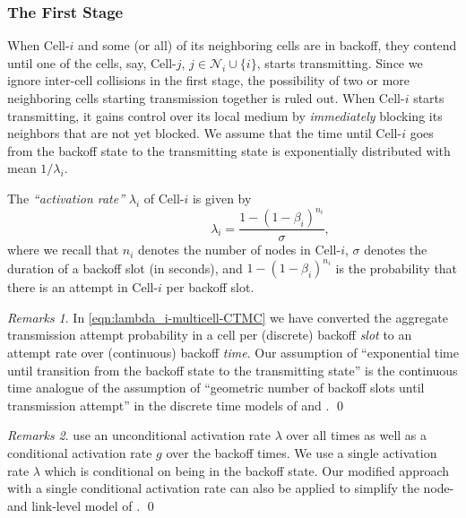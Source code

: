 \documentclass[10pt,a4paper,journal]{IEEEtran}
\theoremstyle{definition}
\theoremstyle{remark}
\newtheorem{remark}{Remarks}[section] \newtheorem{discussion}{Discussion}[section] \newtheorem{example}{Example}[section]
\theoremstyle{plain}
\begin{document}
\subsubsection{The First Stage}
\label{subsubsec:first-stage}

When Cell-$i$ and some (or all) of its neighboring cells are in backoff, they contend until one of the cells, say, Cell-$j$, ${j \in \mathcal{N}_i \cup \{i\}}$, starts transmitting. Since we ignore inter-cell collisions in the first stage, the possibility of two or more neighboring cells starting transmission together is ruled out. When Cell-$i$ starts transmitting, it gains control over its local medium by \textit{immediately} blocking its neighbors that are not yet blocked. We assume that the time until Cell-$i$ goes from the backoff state to the transmitting state is exponentially distributed with mean $1/\lambda_i$.  

The \textit{``activation rate''} $\lambda_i$ of Cell-$i$ is given by 
\begin{equation} 
\label{eqn:lambda_i-multicell-CTMC}
\quad \quad \quad \quad \quad \quad \lambda_i = \frac{1 - (1 - \beta_i)^{n_i}}{\sigma}, 
\end{equation} 
where we recall that $n_i$ denotes the number of nodes in Cell-$i$, $\sigma$ denotes the duration of a backoff slot (in seconds), and $1 - (1 - \beta_i)^{n_i}$ is the probability that there is an attempt in Cell-$i$ per backoff slot. 


\begin{remark}
\label{rmk:exponential-activation}
In \eqref{eqn:lambda_i-multicell-CTMC} we have converted the aggregate transmission attempt probability in a cell per (discrete) backoff \textit{slot} to an attempt rate over (continuous) backoff \textit{time}.  Our assumption of ``exponential time until transition from the backoff state to the transmitting state'' is the continuous time analogue of the assumption of ``geometric number of backoff slots until transmission attempt'' in the discrete time models of \cite{wanet.bianchi00performance} and \cite{wanet.kumar_etal07new_insights}. \hfill \qed
\end{remark}


\begin{remark}
\label{rmk:compare-garetto}
\cite{wanet.garetto_etal08starvation} use an unconditional activation rate $\lambda$ over all times as well as a conditional activation rate $g$ over the backoff times. We use a single activation rate $\lambda$ which is conditional on being in the backoff state. Our modified approach with a single conditional activation rate can also be applied to simplify the node- and link-level model of \cite{wanet.garetto_etal08starvation}. \hfill \qed
\end{remark}
\end{document}
